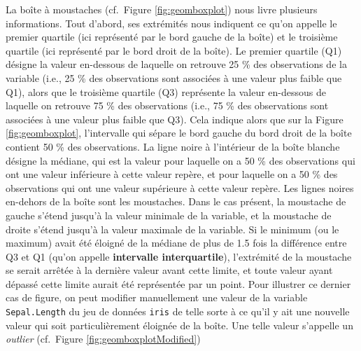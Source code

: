 \documentclass[
  french,
]{book}
\newenvironment{Shaded}{\begin{snugshade}}{\end{snugshade}}
\newcommand{\CommentTok}[1]{\textcolor[rgb]{0.56,0.35,0.01}{\textit{#1}}}
\newcommand{\DataTypeTok}[1]{\textcolor[rgb]{0.13,0.29,0.53}{#1}}
\newcommand{\DecValTok}[1]{\textcolor[rgb]{0.00,0.00,0.81}{#1}}
\newcommand{\KeywordTok}[1]{\textcolor[rgb]{0.13,0.29,0.53}{\textbf{#1}}}
\newcommand{\NormalTok}[1]{#1}
\newcommand{\OperatorTok}[1]{\textcolor[rgb]{0.81,0.36,0.00}{\textbf{#1}}}
\newcommand{\StringTok}[1]{\textcolor[rgb]{0.31,0.60,0.02}{#1}}
\begin{document}
La boîte à moustaches (cf.~Figure \ref{fig:geomboxplot}) nous livre plusieurs informations. Tout d'abord, ses extrémités nous indiquent ce qu'on appelle le premier quartile (ici représenté par le bord gauche de la boîte) et le troisième quartile (ici représenté par le bord droit de la boîte). Le premier quartile (Q1) désigne la valeur en-dessous de laquelle on retrouve 25 \% des observations de la variable (i.e., 25 \% des observations sont associées à une valeur plus faible que Q1), alors que le troisième quartile (Q3) représente la valeur en-dessous de laquelle on retrouve 75 \% des observations (i.e., 75 \% des observations sont associées à une valeur plus faible que Q3). Cela indique alors que sur la Figure \ref{fig:geomboxplot}, l'intervalle qui sépare le bord gauche du bord droit de la boîte contient 50 \% des observations. La ligne noire à l'intérieur de la boîte blanche désigne la médiane, qui est la valeur pour laquelle on a 50 \% des observations qui ont une valeur inférieure à cette valeur repère, et pour laquelle on a 50 \% des observations qui ont une valeur supérieure à cette valeur repère. Les lignes noires en-dehors de la boîte sont les moustaches. Dans le cas présent, la moustache de gauche s'étend jusqu'à la valeur minimale de la variable, et la moustache de droite s'étend jusqu'à la valeur maximale de la variable. Si le minimum (ou le maximum) avait été éloigné de la médiane de plus de 1.5 fois la différence entre Q3 et Q1 (qu'on appelle \textbf{intervalle interquartile}), l'extrémité de la moustache se serait arrêtée à la dernière valeur avant cette limite, et toute valeur ayant dépassé cette limite aurait été représentée par un point. Pour illustrer ce dernier cas de figure, on peut modifier manuellement une valeur de la variable \texttt{Sepal.Length} du jeu de données \texttt{iris} de telle sorte à ce qu'il y ait une nouvelle valeur qui soit particulièrement éloignée de la boîte. Une telle valeur s'appelle un \emph{outlier} (cf.~Figure \ref{fig:geomboxplotModified})

\begin{Shaded}
\end{Shaded}
\end{document}

